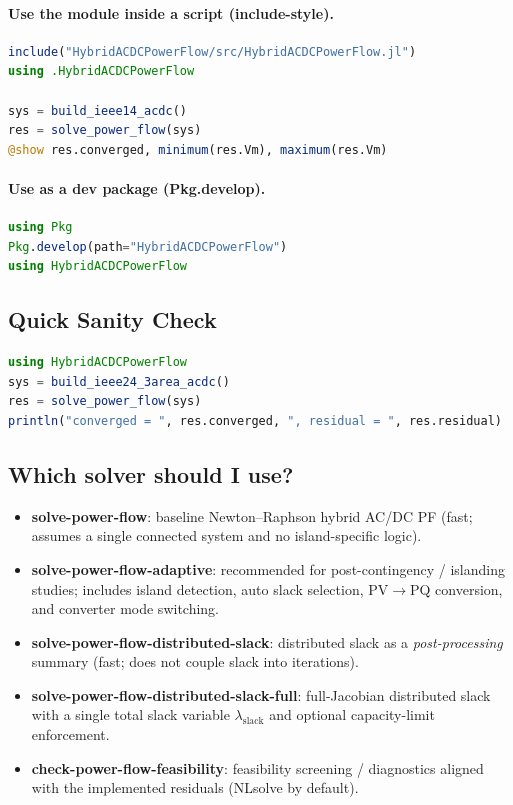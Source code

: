 \documentclass[11pt]{article}
\def\code#1{#1}%
\def\_{-}%
\newcommand{\code}[1]{\nolinkurl{#1}}
\begin{document}
\paragraph{Use the module inside a script (include-style).}
\begin{lstlisting}[language=Julia]
include("HybridACDCPowerFlow/src/HybridACDCPowerFlow.jl")
using .HybridACDCPowerFlow

sys = build_ieee14_acdc()
res = solve_power_flow(sys)
@show res.converged, minimum(res.Vm), maximum(res.Vm)
\end{lstlisting}

\paragraph{Use as a dev package (Pkg.develop).}
\begin{lstlisting}[language=Julia]
using Pkg
Pkg.develop(path="HybridACDCPowerFlow")
using HybridACDCPowerFlow
\end{lstlisting}

\subsection{Quick Sanity Check}
\begin{lstlisting}[language=Julia]
using HybridACDCPowerFlow
sys = build_ieee24_3area_acdc()
res = solve_power_flow(sys)
println("converged = ", res.converged, ", residual = ", res.residual)
\end{lstlisting}

\subsection{Which solver should I use?}
\begin{itemize}[leftmargin=*]
  \item \textbf{\code{solve\_power\_flow}}: baseline Newton--Raphson hybrid AC/DC PF (fast; assumes a single connected system and no island-specific logic).
  \item \textbf{\code{solve\_power\_flow\_adaptive}}: recommended for post-contingency / islanding studies; includes island detection, auto slack selection, PV$\rightarrow$PQ conversion, and converter mode switching.
  \item \textbf{\code{solve\_power\_flow\_distributed\_slack}}: distributed slack as a \emph{post-processing} summary (fast; does not couple slack into iterations).
  \item \textbf{\code{solve\_power\_flow\_distributed\_slack\_full}}: full-Jacobian distributed slack with a single total slack variable $\lambda_{\text{slack}}$ and optional capacity-limit enforcement.
  \item \textbf{\code{check\_power\_flow\_feasibility}}: feasibility screening / diagnostics aligned with the implemented residuals (NLsolve by default).
\end{itemize}
\end{document}
